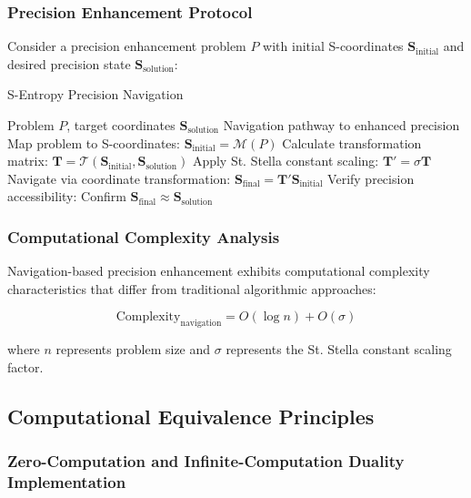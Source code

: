 \documentclass[12pt,a4paper]{article}
\begin{document}
{{{{{{{{{{{{{\subsubsection{Precision Enhancement Protocol}

Consider a precision enhancement problem $P$ with initial S-coordinates $\mathbf{S}_{\text{initial}}$ and desired precision state $\mathbf{S}_{\text{solution}}$:

\begin{algorithm}[H]
\caption{S-Entropy Precision Navigation}
\begin{algorithmic}[1]
\REQUIRE Problem $P$, target coordinates $\mathbf{S}_{\text{solution}}$
\ENSURE Navigation pathway to enhanced precision
\STATE Map problem to S-coordinates: $\mathbf{S}_{\text{initial}} = \mathcal{M}(P)$
\STATE Calculate transformation matrix: $\mathbf{T} = \mathcal{T}(\mathbf{S}_{\text{initial}}, \mathbf{S}_{\text{solution}})$
\STATE Apply St. Stella constant scaling: $\mathbf{T}' = \sigma \mathbf{T}$
\STATE Navigate via coordinate transformation: $\mathbf{S}_{\text{final}} = \mathbf{T}' \mathbf{S}_{\text{initial}}$
\STATE Verify precision accessibility: Confirm $\mathbf{S}_{\text{final}} \approx \mathbf{S}_{\text{solution}}$
\end{algorithmic}
\end{algorithm}

\subsubsection{Computational Complexity Analysis}

Navigation-based precision enhancement exhibits computational complexity characteristics that differ from traditional algorithmic approaches:

\begin{equation}
\text{Complexity}_{\text{navigation}} = O(\log n) + O(\sigma)
\label{eq:navigation_complexity}
\end{equation}

where $n$ represents problem size and $\sigma$ represents the St. Stella constant scaling factor.

\subsection{Computational Equivalence Principles}

\subsubsection{Zero-Computation and Infinite-Computation Duality Implementation}

}}}}}}}}}}}}}
\end{document}

